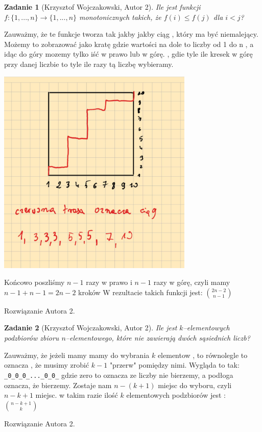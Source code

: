 \documentclass{mwart}
\newtheorem{zad}{Zadanie}[section]
\begin{document}
\begin{zad}[Krzysztof Wojczakowski, Autor 2]
    Ile jest funkcji $f:\{1, ..., n\} \to \{1, ..., n\}$ monotonicznych takich,
    że $f(i) \leq f(j) $ dla $i < j$?
\end{zad}
\begin{mdframed}
    Zauważmy, że te funkcje tworza tak jakby jakby ciąg , który ma być niemalejący.
    Możemy to zobrazować jako kratę gdzie wartości na dole to liczby od 1 do n , a idąc do góry
    mozemy tylko iść w prawo lub w górę. , gdie tyle ile kresek w górę przy danej liczbie to tyle ile razy tą liczbę wybieramy.
    \vspace{0.3em} %

    \noindent
    \centering
    \includegraphics[width=0.7\textwidth]{images/zadanie28.png}

    Końcowo poszliśmy $n-1$ razy w prawo i $n-1$ razy w górę, czyli mamy $n-1+n-1 = 2n - 2$ kroków
    W rezultacie takich funkcji jest:
    \( \binom{2n-2}{n-1} \)
\end{mdframed}
\begin{mdframed}
    Rozwiązanie Autora 2.
\end{mdframed}




\begin{zad}[Krzysztof Wojczakowski, Autor 2]
    Ile jest $k$--elementowych podzbiorów zbioru $n$--elementowego, które nie
    zawierają dwóch sąsiednich liczb?
\end{zad}
\begin{mdframed}
    Zauważmy, że jeżeli mamy mamy do wybrania $k$ elementow , to równolegle to oznacza , że
    musimy zrobić $k-1$ "przerw" pomiędzy nimi. Wygląda to tak:
    \verb|_0_0_0_..._0_0_|
    gdzie zero to oznacza ze liczby nie bierzemy, a podłoga oznacza, że bierzemy.
    Zostaje nam $n-(k+1)$ miejsc do wyboru, czyli $n-k+1$ miejsc.
    w takim razie ilość $k$ elementowych podzbiorów jest :
    \( \binom{n-k+1}{k} \)

\end{mdframed}
\begin{mdframed}
    Rozwiązanie Autora 2.
\end{mdframed}
\end{document}
